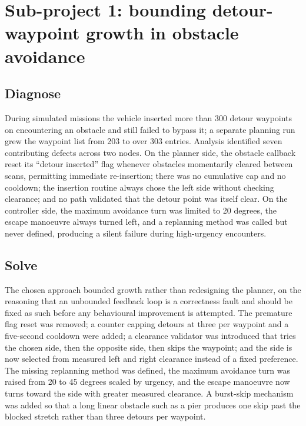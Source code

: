 \documentclass[a4paper,12pt,oneside,openany]{report}
\begin{document}
\section{Sub-project 1: bounding detour-waypoint growth in obstacle avoidance}
\label{sec:sub-avoidance}

\subsection{Diagnose}

During simulated missions the vehicle inserted more than 300 detour waypoints on encountering an
obstacle and still failed to bypass it; a separate planning run grew the waypoint list from 203 to
over 303 entries. Analysis identified seven contributing defects across two nodes. On the planner
side, the obstacle callback reset its ``detour inserted'' flag whenever obstacles momentarily
cleared between scans, permitting immediate re-insertion; there was no cumulative cap and no
cooldown; the insertion routine always chose the left side without checking clearance; and no path
validated that the detour point was itself clear. On the controller side, the maximum avoidance
turn was limited to 20 degrees, the escape manoeuvre always turned left, and a replanning method
was called but never defined, producing a silent failure during high-urgency encounters.

\subsection{Solve}

The chosen approach bounded growth rather than redesigning the planner, on the reasoning that an
unbounded feedback loop is a correctness fault and should be fixed as such before any behavioural
improvement is attempted. The premature flag reset was removed; a counter capping detours at three
per waypoint and a five-second cooldown were added; a clearance validator was introduced that tries
the chosen side, then the opposite side, then skips the waypoint; and the side is now selected from
measured left and right clearance instead of a fixed preference. The missing replanning method was
defined, the maximum avoidance turn was raised from 20 to 45 degrees scaled by urgency, and the
escape manoeuvre now turns toward the side with greater measured clearance. A burst-skip mechanism
was added so that a long linear obstacle such as a pier produces one skip past the blocked stretch
rather than three detours per waypoint.
\end{document}

